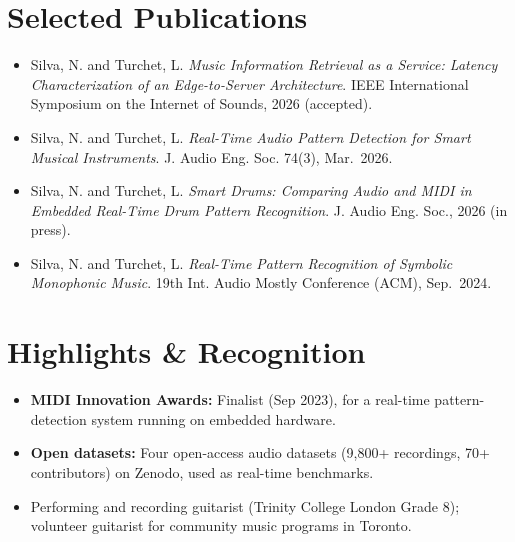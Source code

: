 \documentclass[11pt]{article}
\begin{document}
\enlargethispage{3\baselineskip}
\section*{Selected Publications \footnotesize {}}
\begin{itemize}[leftmargin=1.2em, itemsep=-0.25em]
    \item Silva, N. and Turchet, L. \textit{Music Information Retrieval as a Service: Latency Characterization of an Edge-to-Server Architecture}. IEEE International Symposium on the Internet of Sounds, 2026 (accepted).
    \item Silva, N. and Turchet, L. \textit{Real-Time Audio Pattern Detection for Smart Musical Instruments}. J. Audio Eng. Soc. 74(3), Mar.~2026.
    \item Silva, N. and Turchet, L. \textit{Smart Drums: Comparing Audio and MIDI in Embedded Real-Time Drum Pattern Recognition}. J. Audio Eng. Soc., 2026 (in press).
    \item Silva, N. and Turchet, L. \textit{Real-Time Pattern Recognition of Symbolic Monophonic Music}. 19th Int. Audio Mostly Conference (ACM), Sep.~2024.
\end{itemize}

\vspace{-0.3em}
\section*{Highlights \& Recognition}
\begin{itemize}[leftmargin=1.2em, itemsep=-0.25em]
    \item \textbf{MIDI Innovation Awards:} Finalist (Sep 2023), for a real-time pattern-detection system running on embedded hardware.
    \item \textbf{Open datasets:} Four open-access audio datasets (9,800+ recordings, 70+ contributors) on Zenodo, used as real-time benchmarks.
    \item Performing and recording guitarist (Trinity College London Grade 8); volunteer guitarist for community music programs in Toronto.
\end{itemize}
\end{document}
